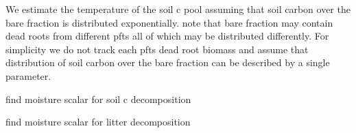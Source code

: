 We estimate the temperature of the soil c pool assuming that soil carbon over the bare fraction is distributed exponentially. note that bare fraction may contain dead roots from different pfts all of which may be distributed differently. For simplicity we do not track each pft\textquotesingle{}s dead root biomass and assume that distribution of soil carbon over the bare fraction can be described by a single parameter.

find moisture scalar for soil c decomposition

find moisture scalar for litter decomposition 